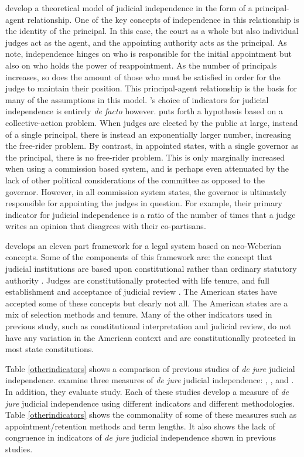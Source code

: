 \documentclass[12pt]{article}
\begin{document}
\citet{Choi2010} develop a theoretical model of judicial independence in the form of a principal-agent relationship.  One of the key concepts of independence in this relationship is the identity of the principal.  In this case, the court as a whole but also individual judges act as the agent, and the appointing authority acts as the principal.  As \citeauthor{Choi2010} note, independence hinges on who is responsible for the initial appointment but also on who holds the power of reappointment.  As the number of principals increases, so does the amount of those who must be satisfied in order for the judge to maintain their position.  This principal-agent relationship is the basis for many of the assumptions in this model.  \citet{Choi2010}'s choice of indicators for judicial independence is entirely \textit{de facto} however.  \citet[296]{Choi2010} puts forth a hypothesis based on a collective-action problem.  When judges are elected by the public at large, instead of a single principal, there is instead an exponentially larger number, increasing the free-rider problem.  By contrast, in appointed states, with a single governor as the principal, there is no free-rider problem.  This is only marginally increased when using a commission based system, and is perhaps even attenuated by the lack of other political considerations of the committee as opposed to the governor.  However, in all commission system states, the governor is ultimately responsible for appointing the judges in question.  For example, their primary indicator for judicial independence is a ratio of the number of times that a judge writes an opinion that disagrees with their co-partisans.

\citet{Schmidhauser1987} develops an eleven part framework for a legal system based on neo-Weberian concepts.  Some of the components of this framework are: the concept that judicial institutions are based upon constitutional rather than ordinary statutory authority \citep{Schmidhauser1987}.  Judges are constitutionally protected with life tenure, and full establishment and acceptance of judicial review \citep[46-47]{Schmidhauser1987}.  The American states have accepted some of these concepts but clearly not all.  The American states are a mix of selection methods and tenure.  Many of the other indicators used in previous study, such as constitutional interpretation and judicial review, do not have any variation in the American context and are constitutionally protected in most state constitutions. 

Table \ref{otherindicators} shows a comparison of previous studies of \textit{de jure} judicial independence.  \citet{Rios2014} examine three measures of \textit{de jure} judicial independence: \citet{Feld2003}, \citet{Keith2002a}, and \citet{Laporta2004}.  In addition, they evaluate \citet{Apodaca2004} study.  Each of these studies develop a measure of \textit{de jure} judicial independence using different indicators and different methodologies.  Table \ref{otherindicators} shows the commonality of some of these measures such as appointment/retention methods and term lengths.  It also shows the lack of congruence in indicators of \textit{de jure} judicial independence shown in previous studies.
\end{document}
